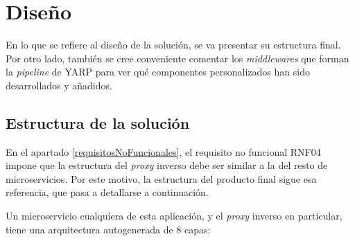 \documentclass[11pt,spanish,listoffigures]{tfgetsinf}
\begin{document}

	\section{Diseño}

En lo que se refiere al diseño de la solución, se va presentar su estructura final. Por otro lado, también se cree conveniente comentar los \emph{middlewares} que forman la \emph{pipeline} de YARP para ver qué componentes personalizados han sido desarrollados y añadidos.


		\subsection{Estructura de la solución} \label{estructuraSolucion}

En el apartado \ref{requisitosNoFuncionales}, el requisito no funcional RNF04 impone que la estructura del \emph{proxy} inverso debe ser similar a la del resto de microservicios. Por este motivo, la estructura del producto final sigue esa referencia, que pasa a detallarse a continuación.

Un microservicio cualquiera de esta aplicación, y el \emph{proxy} inverso en particular, tiene una arquitectura autogenerada de 8 capas:
\end{document}
